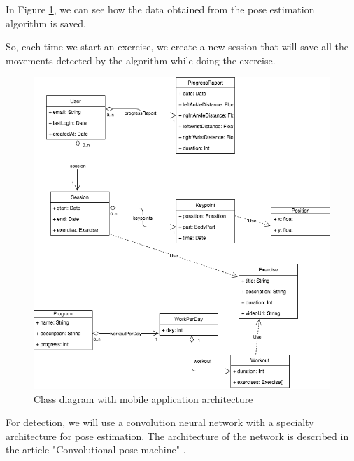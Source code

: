 In Figure \ref{fig:uml-mobile}, we can see how the data obtained from the pose estimation algorithm is saved.

So, each time we start an exercise, we create a new session that will save all the movements detected by the algorithm while doing the exercise.

 \begin{figure}[htbp]
	\centerline{\includegraphics[scale=0.6]{fig/uml-mobile.png}}  
	\caption{Class diagram with mobile application architecture}
	\label{fig:uml-mobile}
\end{figure}

For detection, we will use a convolution neural network with a specialty architecture for pose estimation.
The architecture of the network is described in the article "Convolutional pose machine" \cite{DBLP:journals/corr/WeiRKS16}.

